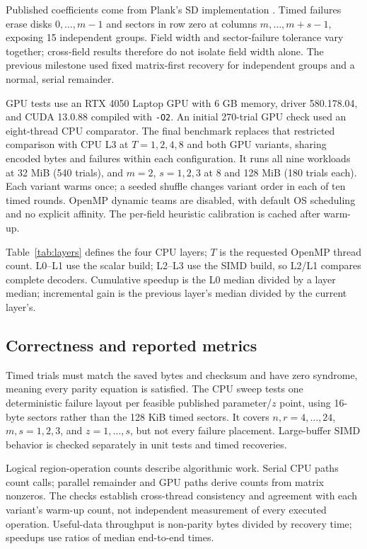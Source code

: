 \documentclass[conference]{IEEEtran}
\begin{document}
Published coefficients come from Plank's SD implementation \cite{plank2013software}. Timed failures erase disks $0,\ldots,m-1$ and sectors in row zero at columns $m,\ldots,m+s-1$, exposing 15 independent groups. Field width and sector-failure tolerance vary together; cross-field results therefore do not isolate field width alone. The previous milestone used fixed matrix-first recovery for independent groups and a normal, serial remainder.

GPU tests use an RTX 4050 Laptop GPU with 6 GB memory, driver 580.178.04, and CUDA 13.0.88 compiled with \texttt{-O2}. An initial 270-trial GPU check used an eight-thread CPU comparator. The final benchmark replaces that restricted comparison with CPU L3 at $T=1,2,4,8$ and both GPU variants, sharing encoded bytes and failures within each configuration. It runs all nine workloads at 32 MiB (540 trials), and $m=2$, $s=1,2,3$ at 8 and 128 MiB (180 trials each). Each variant warms once; a seeded shuffle changes variant order in each of ten timed rounds. OpenMP dynamic teams are disabled, with default OS scheduling and no explicit affinity. The per-field heuristic calibration is cached after warm-up.

Table~\ref{tab:layers} defines the four CPU layers; $T$ is the requested OpenMP thread count. L0--L1 use the scalar build; L2--L3 use the SIMD build, so L2/L1 compares complete decoders. Cumulative speedup is the L0 median divided by a layer median; incremental gain is the previous layer's median divided by the current layer's.

\subsection{Correctness and reported metrics}
Timed trials must match the saved bytes and checksum and have zero syndrome, meaning every parity equation is satisfied. The CPU sweep tests one deterministic failure layout per feasible published parameter/$z$ point, using 16-byte sectors rather than the 128 KiB timed sectors. It covers $n,r=4,\ldots,24$, $m,s=1,2,3$, and $z=1,\ldots,s$, but not every failure placement. Large-buffer SIMD behavior is checked separately in unit tests and timed recoveries.

Logical region-operation counts describe algorithmic work. Serial CPU paths count calls; parallel remainder and GPU paths derive counts from matrix nonzeros. The checks establish cross-thread consistency and agreement with each variant's warm-up count, not independent measurement of every executed operation. Useful-data throughput is non-parity bytes divided by recovery time; speedups use ratios of median end-to-end times.
\end{document}
